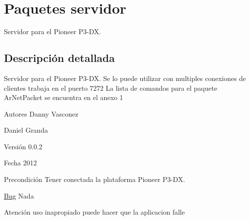 \hypertarget{namespaceservidor}{
\section{Paquetes servidor}
\label{namespaceservidor}
}


Servidor para el Pioneer P3-\/DX.  




\subsection{Descripción detallada}
Servidor para el Pioneer P3-\/DX. Se lo puede utilizar con multiples conexiones de clientes trabaja en el puerto 7272 La lista de comandos para el paquete ArNetPacket se encuentra en el anexo 1 \begin{DoxyAuthor}{Autores}
Danny Vasconez 

Daniel Granda 
\end{DoxyAuthor}
\begin{DoxyVersion}{Versión}
0.0.2 
\end{DoxyVersion}
\begin{DoxyDate}{Fecha}
2012 
\end{DoxyDate}
\begin{DoxyPrecond}{Precondición}
Tener conectada la plataforma Pioneer P3-\/DX. 
\end{DoxyPrecond}
\begin{Desc}
\item[\hyperlink{bug__bug000003}{Bug}]Nada \end{Desc}
\begin{DoxyWarning}{Atención}
uso inapropiado puede hacer que la aplicacion falle 
\end{DoxyWarning}
